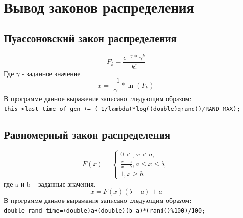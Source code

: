 \documentclass{article}
\begin{document}
	\section{Вывод законов распределения}
	\subsection{Пуассоновский закон распределения }
	\begin{equation*}F_k=\frac{e^{-\gamma}*\gamma^k}{k!}
	\end{equation*}
	Где $\gamma$ - заданное значение.\\
	
	\begin{equation*}x=\frac{-1}{\gamma}*\ln(F_k)\end{equation*}
	В программе данное выражение записано следующим образом:\\
	\lstinline|this->last_time_of_gen += (-1/lambda)*log((double)qrand()/RAND_MAX);|
	
	\subsection{Равномерный закон распределения}
	\begin{equation*}
	F(x)=
	\begin{cases}
	0<, x<a, 
	\\
	\frac{x-a}{x-b}, a \le x \le b,
	\\
	1, x\ge b.
	\end{cases}
	\end{equation*}
	где a и b – заданные значения. 
	\begin{equation*}
	x=F(x)(b-a)+a
	\end{equation*}
	В программе данное выражение записано следующим образом:\\
	\lstinline|double rand_time=(double)a+(double)(b-a)*(rand()%100)/100;|
	\newpage
\end{document}
